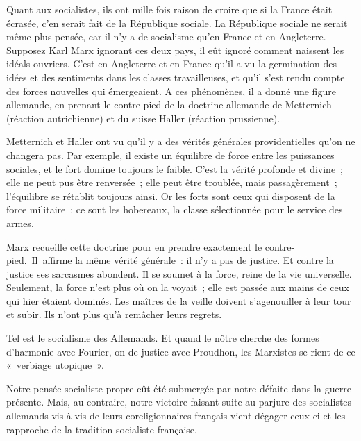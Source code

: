 \documentclass[french,twoside]{book} %
\begin{document}
Quant aux socialistes, ils ont mille fois raison de croire que si la France était écrasée, c’en serait fait de la République sociale. La République sociale ne serait même plus pensée, car il n’y a de socialisme qu’en France et en Angleterre. Supposez Karl Marx ignorant ces deux pays, il eût ignoré comment naissent les idéals ouvriers. C’est en Angleterre et en France qu’il a vu la germination des idées et des sentiments dans les classes travailleuses, et qu’il s’est rendu compte des forces nouvelles qui émergeaient. A ces phénomènes, il a donné une figure allemande, en prenant le contre-pied de la doctrine allemande de Metternich (réaction autrichienne) et du suisse Haller (réaction prussienne).‌\par
Metternich et Haller ont vu qu’il y a des vérités générales providentielles qu’on ne changera pas. Par exemple, il existe un équilibre de force entre les puissances sociales, et le fort domine toujours le faible. C’est la vérité profonde et divine ; elle ne peut pus être renversée ; elle peut être troublée, mais passagèrement ; l’équilibre se rétablit toujours ainsi. Or les forts sont ceux qui disposent de la force militaire ; ce sont les hobereaux, la classe sélectionnée pour le service des armes.‌\par
Marx recueille cette doctrine pour en prendre exactement le contre-pied. Il affirme la même vérité générale : il n’y a pas de justice. Et contre la justice ses sarcasmes abondent. Il se soumet à la force, reine de la vie universelle. Seulement, la force n’est plus où on la voyait ; elle est passée aux mains de ceux qui hier étaient dominés. Les maîtres de la veille doivent s’agenouiller à leur tour et subir. Ils n’ont plus qu’à remâcher leurs regrets.‌\par
Tel est le socialisme des Allemands. Et quand le nôtre cherche des formes d’harmonie avec Fourier, on de justice avec Proudhon, les Marxistes se rient de ce « verbiage utopique ».‌\par
Notre pensée socialiste propre eût été submergée par notre défaite dans la guerre présente. Mais, au contraire, notre victoire faisant suite au parjure des socialistes allemands vis-à-vis de leurs coreligionnaires français vient dégager ceux-ci et les rapproche de la tradition socialiste française.‌\par
\end{document}

